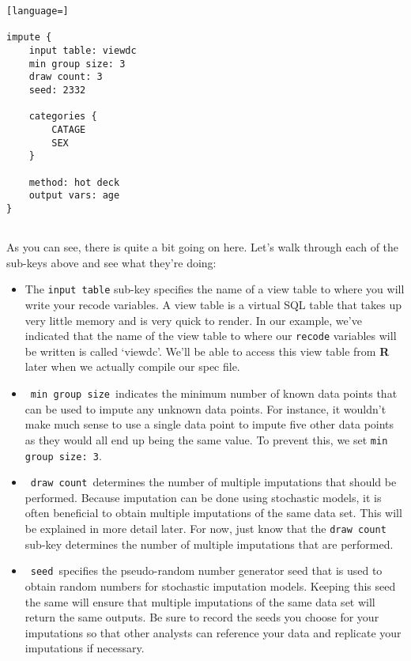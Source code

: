 \documentclass{article}
\begin{document}
\begin{lstlisting}[language=]

impute {
    input table: viewdc
    min group size: 3
    draw count: 3
    seed: 2332

    categories {
        CATAGE
        SEX
    }

    method: hot deck
    output vars: age
}


\end{lstlisting}

As you can see, there is quite a bit going on here. Let's walk through each of the sub-keys 
above and see what they're doing:
\begin{itemize}
\item The {\tt input table} sub-key specifies the name of a view table to 
where you will write your recode variables. A view table is a virtual SQL table 
that takes up very little memory and is very quick to render. In our example, we've indicated 
that the name of the view table to where our {\tt recode} variables will be written is 
called `viewdc'. We'll be able to access this view table from \textbf{R} later when we actually 
compile our spec file.\\
\item \ {\tt min group size}\ indicates the minimum number of known data points that can be 
used to impute any unknown data points. For instance, it wouldn't make much sense to use a single 
data point to impute five other data points as they would all end up being the same value. To 
prevent this, we set {\tt min group size: 3}.\\
\item \ {\tt draw count}\ determines the number of multiple imputations that should be performed. 
Because imputation can be done using stochastic models, it is often beneficial to obtain multiple 
imputations of the same data set. This will be explained in more detail later. For now, just know 
that the {\tt draw count} sub-key determines the number of multiple imputations that are performed.\\
\item \ {\tt seed}\ specifies the pseudo-random number generator seed that is used to obtain 
random numbers for stochastic imputation models. Keeping this seed the same will ensure that multiple imputations of the same data set will return the same outputs. Be sure to record the seeds you choose for your 
imputations so that other analysts can reference your data and replicate your imputations if necessary.\\

\end{itemize}
\end{document}
